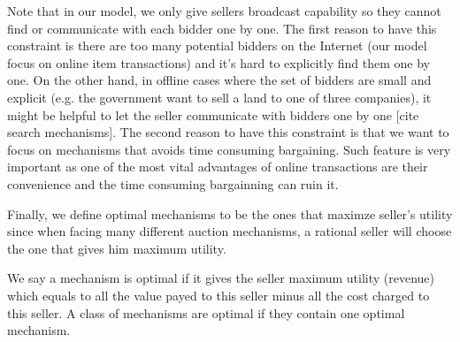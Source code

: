 Note that in our model, we only give sellers broadcast capability so they
cannot find or communicate with each bidder one by one. The first reason to
have this constraint is there are too many potential bidders on the Internet
(our model focus on online item transactions) and it's hard to explicitly find
them one by one. On the other hand, in offline cases where the set of bidders
are small and explicit (e.g. the government want to sell a land to one of three
companies), it might be helpful to let the seller communicate with bidders one
by one [cite search mechanisms]. The second reason to have this constraint is
that we want to focus on mechanisms that avoids time consuming bargaining. Such
feature is very important as one of the most vital advantages of online
transactions are their convenience and the time consuming bargainning can ruin
it.

Finally, we define optimal mechanisms to be the ones that maximze seller's
utility since when facing many different auction mechanisms, a rational seller
will choose the one that gives him maximum utility.

\begin{definition}

We say a mechanism is optimal if it gives the seller maximum utility (revenue)
which equals to all the value payed to this seller minus all the cost charged
to this seller. A class of mechanisms are optimal if they contain one optimal
mechanism.

\end{definition}
